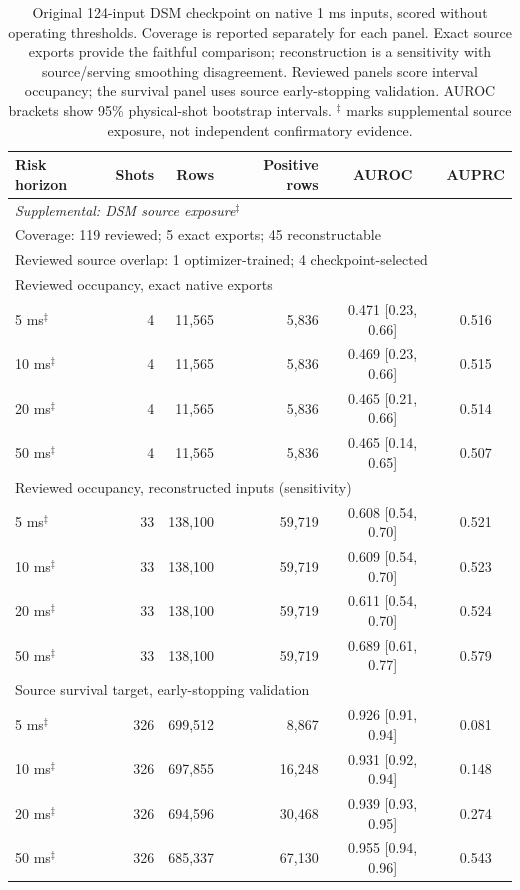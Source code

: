 \begin{table}[t]
\centering
\small
\begin{tabular}{lrrrcc}
\toprule
Risk horizon & Shots & Rows & Positive rows & AUROC & AUPRC \\
\midrule\multicolumn{6}{l}{\emph{Supplemental: DSM source exposure$^{\ddagger}$}} \\
\multicolumn{6}{l}{Coverage: 119 reviewed; 5 exact exports; 45 reconstructable} \\
\multicolumn{6}{l}{Reviewed source overlap: 1 optimizer-trained; 4 checkpoint-selected} \\
\midrule
\multicolumn{6}{l}{Reviewed occupancy, exact native exports} \\
5 ms$^{\ddagger}$ & 4 & 11,565 & 5,836 & 0.471 {\scriptsize[0.23, 0.66]} & 0.516 \\
10 ms$^{\ddagger}$ & 4 & 11,565 & 5,836 & 0.469 {\scriptsize[0.23, 0.66]} & 0.515 \\
20 ms$^{\ddagger}$ & 4 & 11,565 & 5,836 & 0.465 {\scriptsize[0.21, 0.66]} & 0.514 \\
50 ms$^{\ddagger}$ & 4 & 11,565 & 5,836 & 0.465 {\scriptsize[0.14, 0.65]} & 0.507 \\
\midrule
\multicolumn{6}{l}{Reviewed occupancy, reconstructed inputs (sensitivity)} \\
5 ms$^{\ddagger}$ & 33 & 138,100 & 59,719 & 0.608 {\scriptsize[0.54, 0.70]} & 0.521 \\
10 ms$^{\ddagger}$ & 33 & 138,100 & 59,719 & 0.609 {\scriptsize[0.54, 0.70]} & 0.523 \\
20 ms$^{\ddagger}$ & 33 & 138,100 & 59,719 & 0.611 {\scriptsize[0.54, 0.70]} & 0.524 \\
50 ms$^{\ddagger}$ & 33 & 138,100 & 59,719 & 0.689 {\scriptsize[0.61, 0.77]} & 0.579 \\
\midrule
\multicolumn{6}{l}{Source survival target, early-stopping validation} \\
5 ms$^{\ddagger}$ & 326 & 699,512 & 8,867 & 0.926 {\scriptsize[0.91, 0.94]} & 0.081 \\
10 ms$^{\ddagger}$ & 326 & 697,855 & 16,248 & 0.931 {\scriptsize[0.92, 0.94]} & 0.148 \\
20 ms$^{\ddagger}$ & 326 & 694,596 & 30,468 & 0.939 {\scriptsize[0.93, 0.95]} & 0.274 \\
50 ms$^{\ddagger}$ & 326 & 685,337 & 67,130 & 0.955 {\scriptsize[0.94, 0.96]} & 0.543 \\
\bottomrule
\end{tabular}\caption{Original 124-input DSM checkpoint on native 1 ms inputs, scored without operating thresholds. Coverage is reported separately for each panel. Exact source exports provide the faithful comparison; reconstruction is a sensitivity with source/serving smoothing disagreement. Reviewed panels score interval occupancy; the survival panel uses source early-stopping validation. AUROC brackets show 95\% physical-shot bootstrap intervals. $^{\ddagger}$ marks supplemental source exposure, not independent confirmatory evidence.}
\label{tab:elm-dsm-native}
\end{table}
